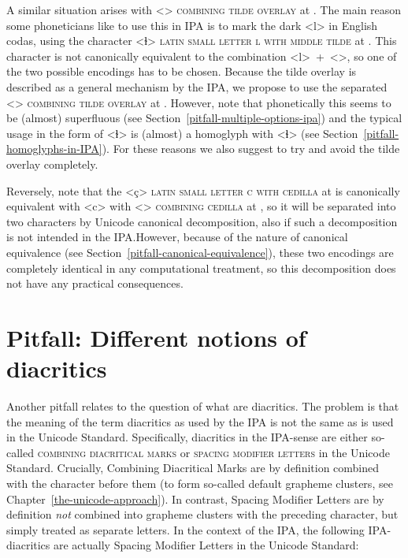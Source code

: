 A similar situation arises with <> \textsc{combining tilde overlay} at
. The main reason some phoneticians like to use this in IPA is to mark
the dark <l> in English codas, using the character <ɫ> \textsc{latin small
letter l with middle tilde} at . This character is not canonically
equivalent to the combination <l>~+~<>, so one of the two possible
encodings has to be chosen. Because the tilde overlay is described as a general
mechanism by the IPA, we propose to use the separated <>
\textsc{combining tilde overlay} at . However, note that phonetically 
this seems to be (almost) superfluous (see Section~\ref{pitfall-multiple-options-ipa}) 
and the typical usage in the form of <ɫ> is (almost) a homoglyph with <ɬ> (see 
Section~\ref{pitfall-homoglyphs-in-IPA}). For these reasons we also suggest to try 
and avoid the tilde overlay completely.

Reversely, note that the <ç> \textsc{latin small letter c with cedilla} at
 is canonically equivalent with <c> with <>
\textsc{combining cedilla} at , so it will be separated into two
characters by Unicode canonical decomposition, also if such a decomposition is
not intended in the IPA.\@ However, because of the nature of canonical
equivalence (see Section~\ref{pitfall-canonical-equivalence}), these two
encodings are completely identical in any computational treatment, so this
decomposition does not have any practical consequences.

\section{Pitfall: Different notions of diacritics}
\label{pitfall-different-notions-of-diacritics}


Another pitfall relates to the question of what are diacritics. The problem is that
the meaning of the term diacritics as used by the IPA is not the same as is used
in the Unicode Standard. Specifically, diacritics in the IPA-sense are either
so-called \textsc{combining diacritical marks} or \textsc{spacing modifier
letters} in the Unicode Standard. Crucially, Combining Diacritical Marks are by
definition combined with the character before them (to form so-called default
grapheme clusters, see Chapter~\ref{the-unicode-approach}). In contrast, Spacing
Modifier Letters are by definition \emph{not} combined into grapheme clusters
with the preceding character, but simply treated as separate letters. In the
context of the IPA, the following IPA-diacritics are actually Spacing Modifier
Letters in the Unicode Standard:

